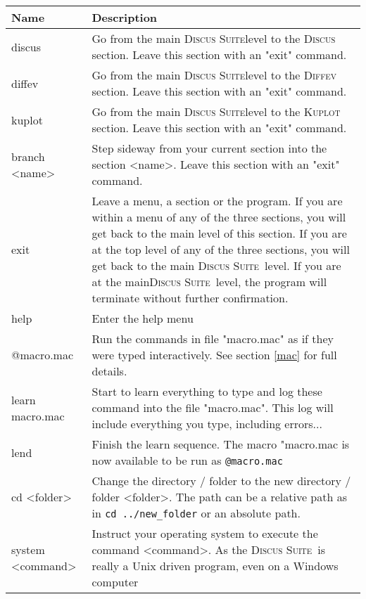 \documentclass[11pt]{report}
\newcommand{\Discus}{\textsc{Discus\ }}
\newcommand{\Diffev}{\textsc{Diffev\ }}
\newcommand{\Kuplot}{\textsc{Kuplot\ }}
\newcommand{\Suite}{\textsc{Discus Suite\ }}
\newcommand{\suite}{\textsc{Discus Suite}}
\begin{document}
\begin{table}[!tbh]
\centering
\begin{tabularx}{\textwidth}{|p{50mm}|X|}
  \hline
  {\bf Name} &  {\bf Description} \\
  \hline\hline
  discus & Go from the main \suite level to the \Discus
           section.
           Leave this section with an "exit" command. \\
  \hline
  diffev & Go from the main \suite level to the \Diffev
           section.
           Leave this section with an "exit" command. \\
  \hline
  kuplot & Go from the main \suite level to the \Kuplot
           section. 
           Leave this section with an "exit" command. \\
  \hline
  branch <name> & Step sideway from your current section into 
           the section <name>. 
           Leave this section with an "exit" command. \\
  \hline
  exit & Leave a menu, a section or the program. If you are 
         within a menu of any of the three sections, you will
         get back to the main level of this section. If you are
         at the top level of any of the three sections, you 
         will get back to the main \Suite level. If you are at
         the main\Suite level, the program will terminate 
         without further confirmation. \\
  \hline
   help & Enter the help menu\\
  \hline
   @macro.mac & Run the commands in file "macro.mac" as if 
          they were typed interactively. See section \ref{mac}
          for full details.\\
  \hline
   learn macro.mac & Start to learn everything to type and
          log these command into the file "macro.mac". 
          This log will include everything you type, including 
          errors...\\
  \hline
   lend & Finish the learn sequence. The macro "macro.mac is 
          now available to be run as {\tt @macro.mac}\\
  \hline
   cd <folder> & Change the directory / folder to the new 
          directory / folder <folder>. 
          The path can be a 
          relative path as in {\tt cd ../new\_folder} or
          an absolute path.\\
  \hline
   system <command> & Instruct your operating system to execute
          the command <command>. As the \Suite is really a
          Unix driven program, even on a Windows computer

\end{tabularx}
\end{table}
\end{document}

